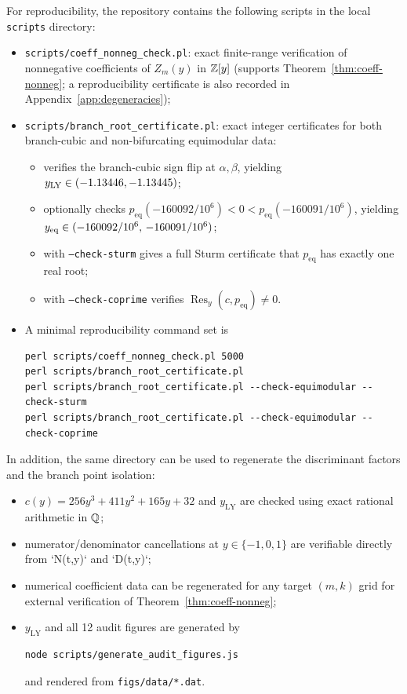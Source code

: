 For reproducibility, the repository contains the following scripts in the local \texttt{scripts} directory:
\begin{itemize}
  \item \texttt{scripts/coeff\_nonneg\_check.pl}: exact finite-range verification of nonnegative coefficients of $Z_m(y)$ in $\mathbb{Z}[y]$ (supports Theorem~\ref{thm:coeff-nonneg}; a reproducibility certificate is also recorded in Appendix~\ref{app:degeneracies});
  \item \texttt{scripts/branch\_root\_certificate.pl}: exact integer certificates for both branch-cubic and non-bifurcating equimodular data:
        \begin{itemize}
          \item verifies the branch-cubic sign flip at $\alpha,\beta$, yielding \(y_{\mathrm{LY}}\in(-1.13446,-1.13445)\);
          \item optionally checks \(p_{\mathrm{eq}}(-160092/10^6)<0<p_{\mathrm{eq}}(-160091/10^6)\), yielding
                \(y_{\mathrm{eq}}\in(-160092/10^6,\,-160091/10^6)\);
          \item with \texttt{--check-sturm} gives a full Sturm certificate that \(p_{\mathrm{eq}}\) has exactly one real root;
          \item with \texttt{--check-coprime} verifies \(\operatorname{Res}_y(c,p_{\mathrm{eq}})\neq0\).
        \end{itemize}
  \item A minimal reproducibility command set is
      \begin{verbatim}
perl scripts/coeff_nonneg_check.pl 5000
perl scripts/branch_root_certificate.pl
perl scripts/branch_root_certificate.pl --check-equimodular --check-sturm
perl scripts/branch_root_certificate.pl --check-equimodular --check-coprime
      \end{verbatim}
\end{itemize}
In addition, the same directory can be used to regenerate the discriminant factors and the branch point isolation:
\begin{itemize}
  \item $c(y)=256y^3+411y^2+165y+32$ and $y_{\mathrm{LY}}$ are checked using exact rational arithmetic in $\mathbb{Q}$;
  \item numerator/denominator cancellations at $y\in\{-1,0,1\}$ are verifiable directly from `N(t,y)` and `D(t,y)`;
  \item numerical coefficient data can be regenerated for any target $(m,k)$ grid for external verification of Theorem~\ref{thm:coeff-nonneg};
  \item $y_{\mathrm{LY}}$ and all 12 audit figures are generated by
        \begin{verbatim}
node scripts/generate_audit_figures.js
        \end{verbatim}
        and rendered from \texttt{figs/data/*.dat}.
\end{itemize}
\FloatBarrier
